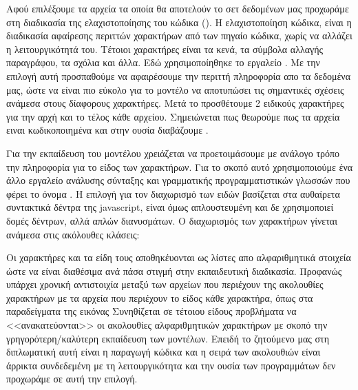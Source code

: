 Αφού επιλέξουμε τα αρχεία τα οποία θα αποτελούν το σετ δεδομένων μας προχωράμε στη διαδικασία της ελαχιστοποίησης του κώδικα ().
Η ελαχιστοποίηση κώδικα, είναι η διαδικασία αφαίρεσης περιττών χαρακτήρων από των πηγαίο κώδικα, χωρίς να αλλάζει η λειτουργικότητά του. Τέτοιοι χαρακτήρες είναι τα κενά, τα σύμβολα αλλαγής παραγράφου, τα σχόλια και άλλα. Εδώ χρησιμοποίηθηκε το εργαλείο .
Με την επιλογή αυτή προσπαθούμε να αφαιρέσουμε την περιττή πληροφορία απο τα δεδομένα μας, ώστε να είναι πιο εύκολο για το μοντέλο να αποτυπώσει τις σημαντικές σχέσεις ανάμεσα στους δίαφορους χαρακτήρες.
Μετά το  προσθέτουμε 2 ειδικούς χαρακτήρες για την αρχή και το τέλος κάθε αρχείου. Σημειώνεται πως θεωρούμε πως τα αρχεία ειναι  κωδικοποιημένα και στην ουσία διαβάζουμε . 

Για την εκπαίδευση του μοντέλου  χρειάζεται να προετοιμάσουμε με ανάλογο τρόπο την πληροφορία για το είδος των χαρακτήρων. Για το σκοπό αυτό χρησιμοποιούμε ένα άλλο εργαλείο ανάλυσης σύνταξης και γραμματικής προγραμματιστικών γλωσσών που φέρει το όνομα .
Η επιλογή για τον διαχωρισμό των ειδών βασίζεται στα αυθαίρετα συντακτικά δέντρα  της javascript, είναι όμως απλουστευμένη και δε χρησιμοποιεί δομές δέντρων, αλλά απλών διανυσμάτων.
Ο διαχωρισμός των χαρακτήρων γίνεται ανάμεσα στις ακόλουθες κλάσεις: 

Οι χαρακτήρες και τα είδη τους αποθηκέυονται ως λίστες απο αλφαριθμητικά στοιχεία ώστε να είναι διαθέσιμα ανά πάσα στιγμή στην εκπαιδευτική διαδικασία.
Προφανώς υπάρχει χρονική αντιστοιχία μεταξύ των αρχείων που περιέχουν της ακολουθίες χαρακτήρων με τα αρχεία που περιέχουν το είδος κάθε χαρακτήρα, όπως στα παραδείγματα της εικόνας %
Συνηθίζεται σε τέτοιου είδους προβλήματα να <<ανακατεύονται>> οι ακολουθίες αλφαριθμητικών χαρακτήρων με σκοπό την γρηγορότερη/καλύτερη εκπαίδευση των μοντέλων.
Επειδή το ζητούμενο μας στη διπλωματική αυτή είναι η παραγωγή κώδικα και η σειρά των ακολουθιών είναι άρρικτα συνδεδεμένη με τη λειτουργικότητα και την ουσία των προγραμμάτων δεν προχωράμε σε αυτή την επιλογή.  


\section{}


